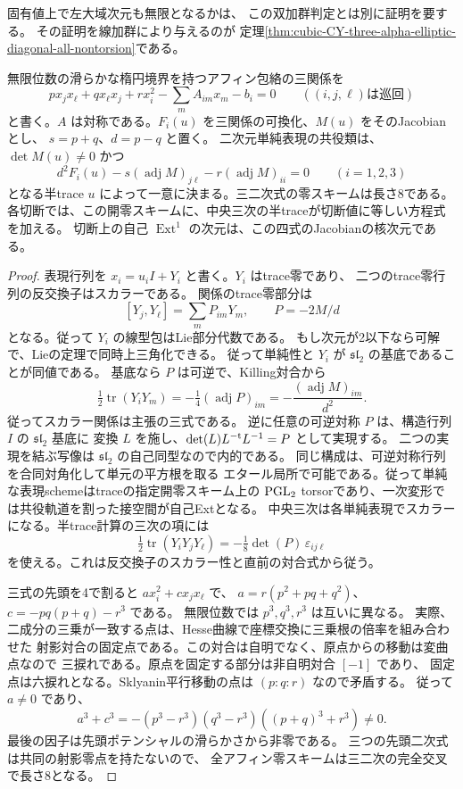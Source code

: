 \begin{remark}
固有値上で左大域次元も無限となるかは、
この双加群判定とは別に証明を要する。
その証明を線加群により与えるのが
定理\ref{thm:cubic-CY-three-alpha-elliptic-diagonal-all-nontorsion}である。
\end{remark}

\begin{theorem}\label{thm:cubic-CY-three-alpha-elliptic-two-dimensional-traces}
無限位数の滑らかな楕円境界を持つアフィン包絡の三関係を
\[
 p x_jx_\ell+q x_\ell x_j+r x_i^2-\sum_m A_{im}x_m-b_i=0
 \qquad ((i,j,\ell)\text{は巡回})
\]
と書く。$A$ は対称である。$F_i(u)$ を三関係の可換化、$M(u)$ をそのJacobianとし、
$s=p+q$、$d=p-q$ と置く。
二次元単純表現の共役類は、$\det M(u)\ne0$ かつ
\[
 d^2 F_i(u)-s(\operatorname{adj}M)_{j\ell}
             -r(\operatorname{adj}M)_{ii}=0 \qquad(i=1,2,3)
\]
となる半trace $u$ によって一意に決まる。三二次式の零スキームは長さ8である。
各切断では、この開零スキームに、中央三次の半traceが切断値に等しい方程式を加える。
切断上の自己 $\operatorname{Ext}^1$ の次元は、この四式のJacobianの核次元である。
\end{theorem}
\begin{proof}
表現行列を $x_i=u_iI+Y_i$ と書く。$Y_i$ はtrace零であり、
二つのtrace零行列の反交換子はスカラーである。
関係のtrace零部分は
\[
 [Y_j,Y_\ell]=\sum_m P_{im}Y_m,\qquad P=-2M/d
\]
となる。従って $Y_i$ の線型包はLie部分代数である。
もし次元が2以下なら可解で、Lieの定理で同時上三角化できる。
従って単純性と $Y_i$ が $\mathfrak{sl}_2$ の基底であることが同値である。
基底なら $P$ は可逆で、Killing対合から
\[
 \tfrac12\operatorname{tr}(Y_iY_m)
 =-\tfrac14(\operatorname{adj}P)_{im}
 =-\frac{(\operatorname{adj}M)_{im}}{d^2}.
\]
従ってスカラー関係は主張の三式である。
逆に任意の可逆対称 $P$ は、構造行列 $I$ の $\mathfrak{sl}_2$ 基底に
変換 $L$ を施し、$\det(L)L^{-{\rm t}}L^{-1}=P$ として実現する。
二つの実現を結ぶ写像は $\mathfrak{sl}_2$ の自己同型なので内的である。
同じ構成は、可逆対称行列を合同対角化して単元の平方根を取る
エタール局所で可能である。従って単純な表現schemeはtraceの指定開零スキーム上の
$\operatorname{PGL}_2$ torsorであり、一次変形では共役軌道を割った接空間が自己Extとなる。
中央三次は各単純表現でスカラーになる。半trace計算の三次の項には
\[
 \tfrac12\operatorname{tr}(Y_iY_jY_\ell)
       =-\tfrac18\det(P)\,\varepsilon_{ij\ell}
\]
を使える。これは反交換子のスカラー性と直前の対合式から従う。

三式の先頭を4で割ると
$a x_i^2+c x_jx_\ell$ で、
$a=r(p^2+pq+q^2)$、$c=-pq(p+q)-r^3$ である。
無限位数では $p^3,q^3,r^3$ は互いに異なる。
実際、二成分の三乗が一致する点は、Hesse曲線で座標交換に三乗根の倍率を組み合わせた
射影対合の固定点である。この対合は自明でなく、原点からの移動は変曲点なので
三捩れである。原点を固定する部分は非自明対合 $[-1]$ であり、
固定点は六捩れとなる。Sklyanin平行移動の点は $(p:q:r)$ なので矛盾する。
従って $a\ne0$ であり、
\[
 a^3+c^3=-(p^3-r^3)(q^3-r^3)((p+q)^3+r^3)\ne0.
\]
最後の因子は先頭ポテンシャルの滑らかさから非零である。
三つの先頭二次式は共同の射影零点を持たないので、
全アフィン零スキームは三二次の完全交叉で長さ8となる。
\end{proof}

